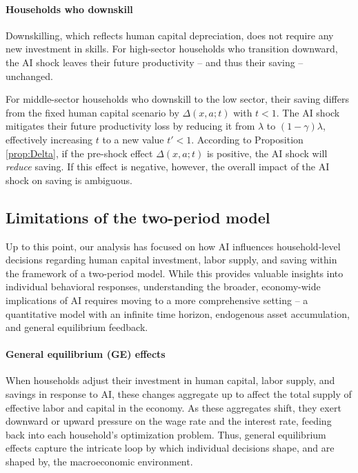 \documentclass[12pt]{article}
\begin{document}
\paragraph{Households who downskill} Downskilling, which reflects human capital depreciation, does not require any new investment in skills. For high-sector households who transition downward, the AI shock leaves their future productivity -- and thus their saving -- unchanged.

For middle-sector households who downskill to the low sector, their saving differs from the fixed human capital scenario by $\Delta(x,a;t)$ with $t<1$. The AI shock mitigates their future productivity loss by reducing it from $\lambda$ to $(1-\gamma)\lambda$, effectively increasing $t$ to a new value $t'<1$. According to Proposition \ref{prop:Delta}, if the pre-shock effect $\Delta(x,a;t)$ is positive, the AI shock will \textit{reduce} saving. If this effect is negative, however, the overall impact of the AI shock on saving is ambiguous.





\subsection{Limitations of the two-period model}
Up to this point, our analysis has focused on how AI influences household-level decisions regarding human capital investment, labor supply, and saving within the framework of a two-period model. While this provides valuable insights into individual behavioral responses, understanding the broader, economy-wide implications of AI requires moving to a more comprehensive setting -- a quantitative model with an infinite time horizon, endogenous asset accumulation, and general equilibrium feedback.

\paragraph{General equilibrium (GE) effects} When households adjust their investment in human capital, labor supply, and savings in response to AI, these changes aggregate up to affect the total supply of effective labor and capital in the economy. As these aggregates shift, they exert downward or upward pressure on the wage rate and the interest rate, feeding back into each household’s optimization problem. Thus, general equilibrium effects capture the intricate loop by which individual decisions shape, and are shaped by, the macroeconomic environment.
\end{document}
